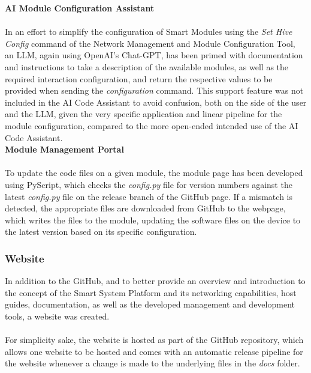 \textbf{\label{sec:methods_codeai}AI Module Configuration Assistant}\\\\
In an effort to simplify the configuration of Smart Modules using the \textit{Set Hive Config} command of the Network Management and Module Configuration Tool, an LLM, again using OpenAI's Chat-GPT, has been primed with documentation and instructions to take a description of the available modules, as well as the required interaction configuration, and return the respective values to be provided when sending the \textit{configuration} command. This support feature was not included in the AI Code Assistant to avoid confusion, both on the side of the user and the LLM, given the very specific application and linear pipeline for the module configuration, compared to the more open-ended intended use of the AI Code Assistant.\\

\textbf{\label{sec:methods_up}Module Management Portal}\\\\
To update the code files on a given module, the module page has been developed using PyScript, which checks the \textit{config.py} file for version numbers against the latest \textit{config.py} file on the release branch of the GitHub page. If a mismatch is detected, the appropriate files are downloaded from GitHub to the webpage, which writes the files to the module, updating the software files on the device to the latest version based on its specific configuration.

\subsubsection{\label{sec:methods_website}Website}
In addition to the GitHub, and to better provide an overview and introduction to the concept of the Smart System Platform and its networking capabilities, host guides, documentation, as well as the developed management and development tools, a website was created.\\\\

For simplicity sake, the website is hosted as part of the GitHub repository, which allows one website to be hosted and comes with an automatic release pipeline for the website whenever a change is made to the underlying files in the \textit{docs} folder.

